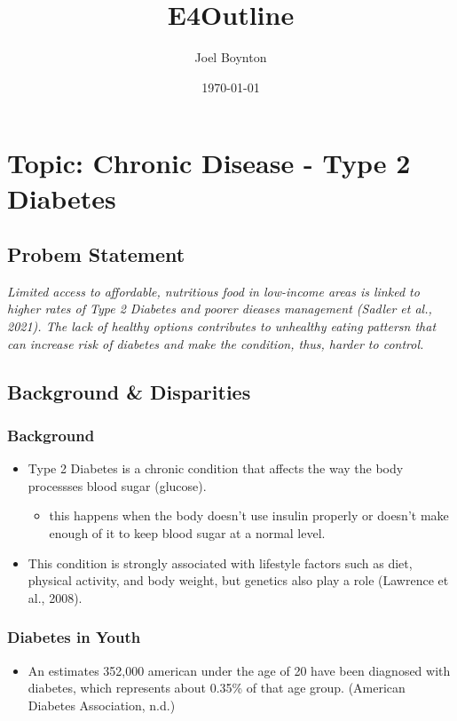 \documentclass[11pt]{article}
\author{Joel Boynton}
\date{\today}
\title{E4Outline}
\begin{document}
\maketitle
\tableofcontents

\section{Topic: Chronic Disease - Type 2 Diabetes}
\label{sec:org241fc24}
\subsection{Probem Statement}
\label{sec:orgf4b7f82}
\emph{Limited access to affordable, nutritious food in low-income areas is linked to higher rates of Type 2 Diabetes and poorer dieases management (Sadler et al., 2021). The lack of healthy options contributes to unhealthy eating pattersn that can increase risk of diabetes and make the condition, thus, harder to control.}
\subsection{Background \& Disparities}
\label{sec:org3312eed}
\subsubsection{Background}
\label{sec:org8a62461}
\begin{itemize}
\item Type 2 Diabetes is a chronic condition that affects the way the body processses blood sugar (glucose).
\begin{itemize}
\item this happens when the body doesn't use insulin properly or doesn't make enough of it to keep blood sugar at a normal level.
\end{itemize}
\item This condition is strongly associated with lifestyle factors such as diet, physical activity, and body weight, but genetics also play a role (Lawrence et al., 2008).
\end{itemize}
\subsubsection{Diabetes in Youth}
\label{sec:org57a1b5e}
\begin{itemize}
\item An estimates 352,000 american under the age of 20 have been diagnosed with diabetes, which represents about 0.35\% of that age group. (American Diabetes Association, n.d.)
\end{itemize}
\end{document}
